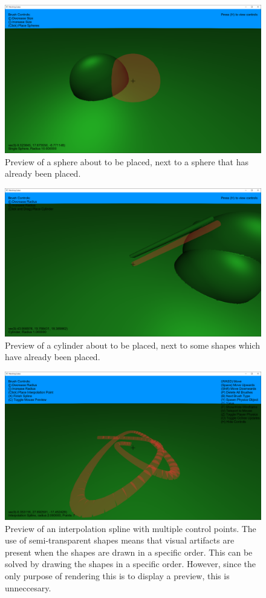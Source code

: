 \documentclass[11pt]{article}
\begin{document}
\begin{figure}[H]
  \includegraphics[width=\textwidth]{sphere_preview.png}
  \caption{Preview of a sphere about to be placed, next to a sphere that has already been placed.}
  \label{fig:sphere_preview}
\end{figure}
\begin{figure}[H]
  \includegraphics[width=\textwidth]{cylinder_preview.png}
  \caption{Preview of a cylinder about to be placed, next to some shapes which have already been placed.}
  \label{fig:cylinder_preview}
\end{figure}
\begin{figure}[H]
  \includegraphics[width=\textwidth]{spline_preview.png}
  \caption{Preview of an interpolation spline with multiple control points. The use of semi-transparent shapes means that visual artifacts are present when the shapes are drawn in a specific order. This can be solved by drawing the shapes in a specific order. However, since the only purpose of rendering this is to display a preview, this is unneccesary.}
  \label{fig:spline_preview}
\end{figure}
\end{document}
